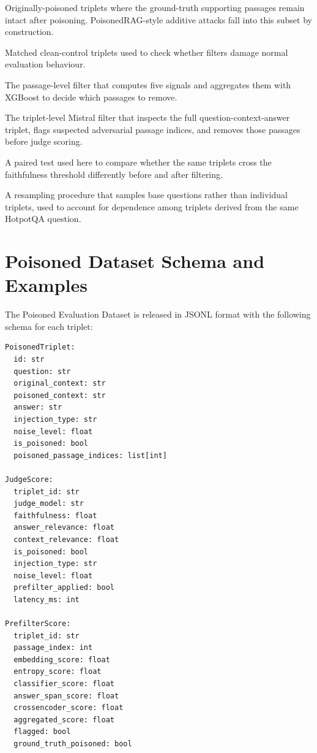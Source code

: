 \begin{description}[leftmargin=3.4cm, style=nextline]
    \item[Survived Subset]
    Originally-poisoned triplets where the ground-truth supporting passages
    remain intact after poisoning. PoisonedRAG-style additive attacks fall into
    this subset by construction.

    \item[Clean Subset]
    Matched clean-control triplets used to check whether filters damage normal
    evaluation behaviour.

    \item[Statistical Filter]
    The passage-level filter that computes five signals and aggregates them
    with XGBoost to decide which passages to remove.

    \item[LLM Filter]
    The triplet-level Mistral filter that inspects the full question-context-answer
    triplet, flags suspected adversarial passage indices, and removes those
    passages before judge scoring.

    \item[McNemar Test]
    A paired test used here to compare whether the same triplets cross the
    faithfulness threshold differently before and after filtering.

    \item[Question-Clustered Bootstrap]
    A resampling procedure that samples base questions rather than individual
    triplets, used to account for dependence among triplets derived from the
    same HotpotQA question.
\end{description}

\chapter{Poisoned Dataset Schema and Examples}
\label{app:schema}

The Poisoned Evaluation Dataset is released in JSONL format with the following
schema for each triplet:

\begin{verbatim}
PoisonedTriplet:
  id: str
  question: str
  original_context: str
  poisoned_context: str
  answer: str
  injection_type: str
  noise_level: float
  is_poisoned: bool
  poisoned_passage_indices: list[int]

JudgeScore:
  triplet_id: str
  judge_model: str
  faithfulness: float
  answer_relevance: float
  context_relevance: float
  is_poisoned: bool
  injection_type: str
  noise_level: float
  prefilter_applied: bool
  latency_ms: int

PrefilterScore:
  triplet_id: str
  passage_index: int
  embedding_score: float
  entropy_score: float
  classifier_score: float
  answer_span_score: float
  crossencoder_score: float
  aggregated_score: float
  flagged: bool
  ground_truth_poisoned: bool
\end{verbatim}

